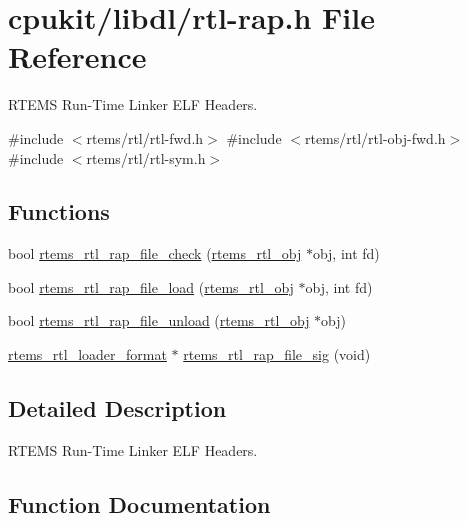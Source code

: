 \hypertarget{rtl-rap_8h}{}\section{cpukit/libdl/rtl-\/rap.h File Reference}
\label{rtl-rap_8h}


R\+T\+E\+MS Run-\/\+Time Linker E\+LF Headers.  


{\ttfamily \#include $<$rtems/rtl/rtl-\/fwd.\+h$>$}\newline
{\ttfamily \#include $<$rtems/rtl/rtl-\/obj-\/fwd.\+h$>$}\newline
{\ttfamily \#include $<$rtems/rtl/rtl-\/sym.\+h$>$}\newline
\subsection*{Functions}
\begin{DoxyCompactItemize}
\item 
bool \mbox{\hyperlink{rtl-rap_8h_a1c969535841d803fd98b4b8f518daf79}{rtems\+\_\+rtl\+\_\+rap\+\_\+file\+\_\+check}} (\mbox{\hyperlink{structrtems__rtl__obj}{rtems\+\_\+rtl\+\_\+obj}} $\ast$obj, int fd)
\item 
bool \mbox{\hyperlink{rtl-rap_8h_a0ce5487461c31a98e4ddda966ad7fad9}{rtems\+\_\+rtl\+\_\+rap\+\_\+file\+\_\+load}} (\mbox{\hyperlink{structrtems__rtl__obj}{rtems\+\_\+rtl\+\_\+obj}} $\ast$obj, int fd)
\item 
bool \mbox{\hyperlink{rtl-rap_8h_ab14c07dd22f90a014ff7e192015cf1c4}{rtems\+\_\+rtl\+\_\+rap\+\_\+file\+\_\+unload}} (\mbox{\hyperlink{structrtems__rtl__obj}{rtems\+\_\+rtl\+\_\+obj}} $\ast$obj)
\item 
\mbox{\hyperlink{structrtems__rtl__loader__format}{rtems\+\_\+rtl\+\_\+loader\+\_\+format}} $\ast$ \mbox{\hyperlink{rtl-rap_8h_a0ba92ca2206cf08da6e0ead2563ae1fd}{rtems\+\_\+rtl\+\_\+rap\+\_\+file\+\_\+sig}} (void)
\end{DoxyCompactItemize}


\subsection{Detailed Description}
R\+T\+E\+MS Run-\/\+Time Linker E\+LF Headers. 



\subsection{Function Documentation}
\mbox{\label{rtl-rap_8h_a1c969535841d803fd98b4b8f518daf79}} 
